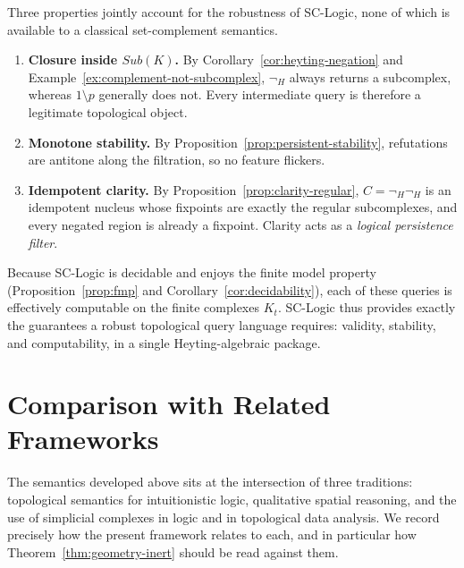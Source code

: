 \documentclass[final,12pt]{elsarticle}
\theoremstyle{plain}
\theoremstyle{definition}
\begin{document}
Three properties jointly account for the robustness of SC-Logic, none of
which is available to a classical set-complement semantics.
\begin{enumerate}
  \item \textbf{Closure inside $Sub(K)$.} By
        Corollary~\ref{cor:heyting-negation} and
        Example~\ref{ex:complement-not-subcomplex}, $\neg_H$ always
        returns a subcomplex, whereas $1\setminus p$ generally does not.
        Every intermediate query is therefore a legitimate topological
        object.
  \item \textbf{Monotone stability.} By
        Proposition~\ref{prop:persistent-stability}, refutations are
        antitone along the filtration, so no feature flickers.
  \item \textbf{Idempotent clarity.} By
        Proposition~\ref{prop:clarity-regular}, $C=\neg_H\neg_H$ is an
        idempotent nucleus whose fixpoints are exactly the regular
        subcomplexes, and every negated region is already a fixpoint.
        Clarity acts as a \emph{logical persistence filter}.
\end{enumerate}

Because SC-Logic is decidable and enjoys the finite model property
(Proposition~\ref{prop:fmp} and Corollary~\ref{cor:decidability}), each
of these queries is effectively computable on the finite complexes
$K_t$. SC-Logic thus provides exactly the guarantees a robust
topological query language requires: validity, stability, and
computability, in a single Heyting-algebraic package.

\section{Comparison with Related Frameworks}
\label{sec:comparison}

The semantics developed above sits at the intersection of three traditions:
topological semantics for intuitionistic logic, qualitative spatial reasoning,
and the use of simplicial complexes in logic and in topological data analysis.
We record precisely how the present framework relates to each, and in
particular how Theorem~\ref{thm:geometry-inert} should be read against them.
\end{document}
